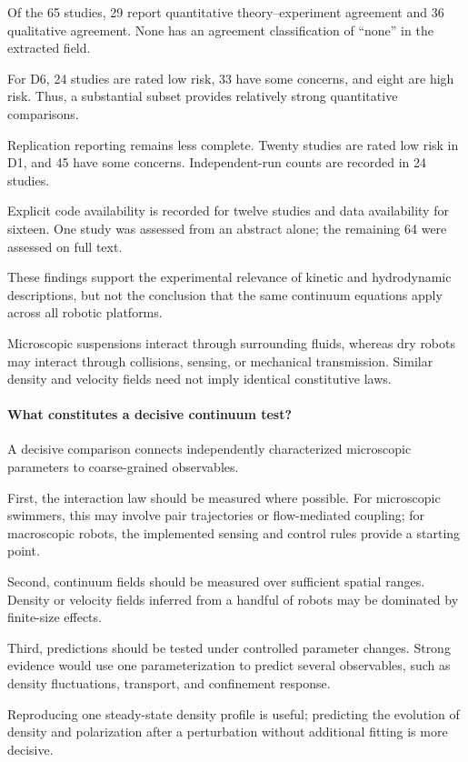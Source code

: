 Of the 65 studies, 29 report quantitative
theory--experiment agreement and 36 qualitative
agreement. None has an agreement classification
of ``none'' in the extracted field.

For D6, 24 studies are rated low risk,
33 have some concerns, and eight are high risk.
Thus, a substantial subset provides
relatively strong quantitative comparisons.

Replication reporting remains less complete.
Twenty studies are rated low risk in D1,
and 45 have some concerns.
Independent-run counts are recorded in 24 studies.

Explicit code availability is recorded
for twelve studies and data availability
for sixteen. One study was assessed from
an abstract alone; the remaining 64
were assessed on full text.

These findings support the experimental relevance
of kinetic and hydrodynamic descriptions,
but not the conclusion that the same continuum
equations apply across all robotic platforms.

Microscopic suspensions interact through
surrounding fluids, whereas dry robots
may interact through collisions,
sensing, or mechanical transmission.
Similar density and velocity fields
need not imply identical constitutive laws.

\paragraph*{What constitutes a decisive continuum test?}

A decisive comparison connects independently
characterized microscopic parameters to
coarse-grained observables.

First, the interaction law should be measured
where possible. For microscopic swimmers,
this may involve pair trajectories or
flow-mediated coupling; for macroscopic robots,
the implemented sensing and control rules
provide a starting point.

Second, continuum fields should be measured
over sufficient spatial ranges. Density
or velocity fields inferred from a handful
of robots may be dominated by finite-size
effects.

Third, predictions should be tested under
controlled parameter changes. Strong evidence
would use one parameterization to predict
several observables, such as density
fluctuations, transport, and confinement
response.

Reproducing one steady-state density profile
is useful; predicting the evolution of
density and polarization after a perturbation
without additional fitting is more decisive.

